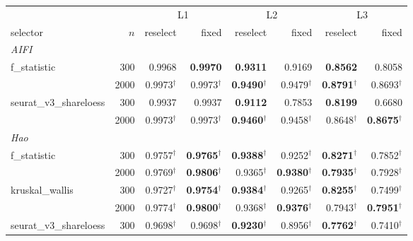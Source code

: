 \begin{table}[t]
\centering
\small
\setlength{\tabcolsep}{4pt}
\begin{tabular}{lrrrrrrr}
\toprule
 & & \multicolumn{2}{c}{L1} & \multicolumn{2}{c}{L2} & \multicolumn{2}{c}{L3} \\
\cmidrule(lr){3-4}\cmidrule(lr){5-6}\cmidrule(lr){7-8}
selector & $n$ & reselect & fixed & reselect & fixed & reselect & fixed \\
\midrule
\multicolumn{8}{l}{\textit{AIFI}} \\
f\_statistic & 300 & 0.9968 & \textbf{0.9970} & \textbf{0.9311} & 0.9169 & \textbf{0.8562} & 0.8058 \\
 & 2000 & \cellcolor{palegreen}0.9973$^\dagger$ & \cellcolor{palegreen}0.9973$^\dagger$ & \cellcolor{palegreen}\textbf{0.9490$^\dagger$} & \cellcolor{palegreen}0.9479$^\dagger$ & \cellcolor{palegreen}\textbf{0.8791$^\dagger$} & \cellcolor{palegreen}0.8693$^\dagger$ \\
\addlinespace
seurat\_v3\_shareloess & 300 & 0.9937 & 0.9937 & \textbf{0.9112} & 0.7853 & \textbf{0.8199} & 0.6680 \\
 & 2000 & \cellcolor{palegreen}0.9973$^\dagger$ & \cellcolor{palegreen}0.9973$^\dagger$ & \textbf{0.9460$^\dagger$} & 0.9458$^\dagger$ & 0.8648$^\dagger$ & \textbf{0.8675$^\dagger$} \\
\midrule
\multicolumn{8}{l}{\textit{Hao}} \\
f\_statistic & 300 & 0.9757$^\dagger$ & \textbf{0.9765$^\dagger$} & \cellcolor{palegreen}\textbf{0.9388$^\dagger$} & 0.9252$^\dagger$ & \cellcolor{palegreen}\textbf{0.8271$^\dagger$} & 0.7852$^\dagger$ \\
 & 2000 & 0.9769$^\dagger$ & \cellcolor{palegreen}\textbf{0.9806$^\dagger$} & 0.9365$^\dagger$ & \cellcolor{palegreen}\textbf{0.9380$^\dagger$} & \textbf{0.7935$^\dagger$} & 0.7928$^\dagger$ \\
\addlinespace
kruskal\_wallis & 300 & 0.9727$^\dagger$ & \textbf{0.9754$^\dagger$} & \textbf{0.9384$^\dagger$} & 0.9265$^\dagger$ & \textbf{0.8255$^\dagger$} & 0.7499$^\dagger$ \\
 & 2000 & 0.9774$^\dagger$ & \textbf{0.9800$^\dagger$} & 0.9368$^\dagger$ & \textbf{0.9376$^\dagger$} & 0.7943$^\dagger$ & \cellcolor{palegreen}\textbf{0.7951$^\dagger$} \\
\addlinespace
seurat\_v3\_shareloess & 300 & 0.9698$^\dagger$ & 0.9698$^\dagger$ & \textbf{0.9230$^\dagger$} & 0.8956$^\dagger$ & \textbf{0.7762$^\dagger$} & 0.7410$^\dagger$ \\

\end{tabular}
\end{table}
